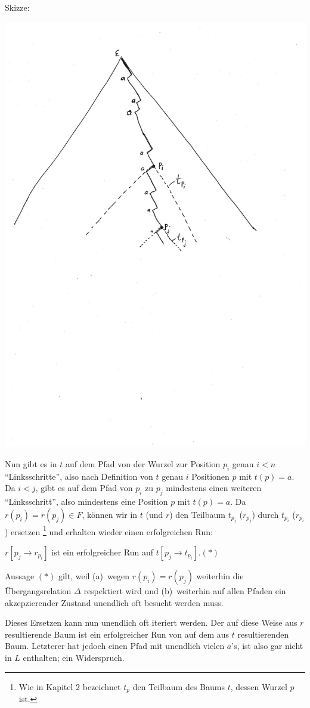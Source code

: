 \documentclass[fontsize=11pt, twoside=false, numbers=autoenddot]{scrbook}
\begin{document}
\par\smallskip
Skizze:
%
\vspace*{-\baselineskip}
\begin{center}
  \includegraphics[width=.7\linewidth,trim=10 390 100 50,clip]{img/t4_6_skizze.pdf}
\end{center}
%
Nun gibt es in $t$ auf dem Pfad von der Wurzel zur Position $p_i$ genau $i < n$
"`Linksschritte"', also nach Definition von $t$ genau $i$ Positionen $p$ mit $t(p) = a$.
Da $i < j$, gibt es auf dem Pfad von $p_i$ zu $p_j$ mindestens einen weiteren
"`Linksschritt"', also mindestens eine Position $p$ mit $t(p)=a$.
Da $r(p_i)=r(p_j) \in F$,
können wir in $t$ (und $r$) den Teilbaum $t_{p_j}$ ($r_{p_j}$)
durch $t_{p_i}$ ($r_{p_i}$) ersetzen%
\footnote{%
  Wie in Kapitel 2 bezeichnet $t_p$ den Teilbaum des Baums $t$,
  dessen Wurzel $p$ ist.
}
und erhalten wieder einen erfolgreichen Run:
%
\begin{center}
  $r[p_j \to r_{p_i}]$ ist ein erfolgreicher Run auf $t[p_j \to t_{p_i}]$.\qquad $(*)$
\end{center}
%
Aussage $(*)$ gilt, weil
(a)~wegen $r(p_i)=r(p_j)$ weiterhin die Übergangsrelation $\Delta$ respektiert wird und
(b)~weiterhin auf allen Pfaden ein akzepzierender Zustand unendlich oft besucht werden muss.

Dieses Ersetzen kann nun unendlich oft iteriert werden.
Der auf diese Weise aus $r$ resultierende Baum ist ein erfolgreicher Run von \Amc
auf dem aus $t$ resultierenden Baum.
Letzterer hat jedoch einen Pfad mit unendlich vielen $a$'s,
ist also gar nicht in $L$ enthalten; ein Widerspruch.
\qedhere
\end{document}
